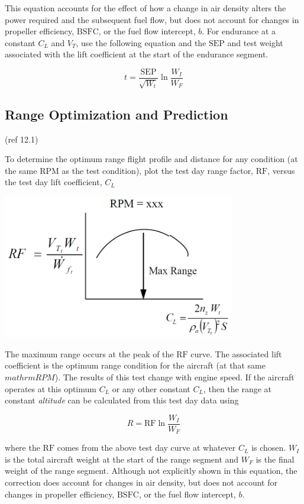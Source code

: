 \documentclass[
]{book}
\begin{document}
This equation accounts for the effect of how a change in air density alters the
power required and the subsequent fuel flow, but does not account for changes in
propeller efficiency, \(\mathrm{BSFC}\), or the fuel flow intercept, \(b\).
For endurance at a constant \(C_L\) and \(V_T\), use the following equation and
the \(\mathrm{SEP}\) and test weight associated with the lift coefficient at the
start of the endurance segment.

\[
t = \frac{\mathrm{SEP}}{\sqrt{W_t}} \ln \frac{W_I}{W_F}
\label{eq:tot-endur-time-const-sep-cl}
\]

\hypertarget{range-optimization-and-prediction}{%
\subsection{Range Optimization and Prediction}\label{range-optimization-and-prediction}}

(ref 12.1)

To determine the optimum range flight profile and distance for any condition (at
the same \(\mathrm{RPM}\) as the test condition), plot the test day range
factor, \(\mathrm{RF}\), versus the test day lift coefficient, \(C_L\)

\includegraphics[width=4in,height=\textheight]{media/12/rng-factor-cl-curve.png}

The maximum range occurs at the peak of the \(\mathrm{RF}\) curve. The
associated lift coefficient is the optimum range condition for the aircraft
(at that same \(mathrm{RPM}\)). The results of this test change with engine
speed. If the aircraft operates at this optimum \(C_L\) or any other constant
\(C_L\), then the range at constant \emph{altitude} can be calculated from this test
day data using

\[
R = \mathrm{RF} \ln \frac{W_I}{W_F}
\label{eq:const-alt-rng}
\]

where the \(\mathrm{RF}\) comes from the above test day curve at whatever
\(C_L\) is chosen. \(W_I\) is the total aircraft weight at the start of the
range segment and \(W_F\) is the final weight of the range segment. Although not
explicitly shown in this equation, the correction does account for changes in
air density, but does not account for changes in propeller efficiency,
\(\mathrm{BSFC}\), or the fuel flow intercept, \(b\).
\end{document}
